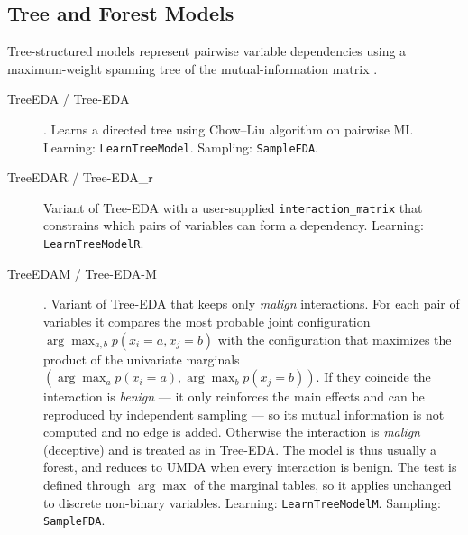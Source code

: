 \documentclass[a4paper,11pt]{article}
\begin{document}
\subsection{Tree and Forest Models}
\label{sec:trees}

Tree-structured models represent pairwise variable dependencies using a maximum-weight spanning tree of the mutual-information matrix \citep{Chow_and_Liu:1968}.

\begin{description}
  \item[TreeEDA / Tree-EDA] \citep{Baluja_and_Davies:1997}.
    Learns a directed tree using Chow--Liu algorithm on pairwise MI.
    Learning: \texttt{LearnTreeModel}. Sampling: \texttt{SampleFDA}.

  \item[TreeEDAR / Tree-EDA\_r] \citep{Baluja:2006,Santana_et_al:2007b}
    Variant of Tree-EDA with a user-supplied \texttt{interaction\_matrix} that constrains which pairs of variables can form a dependency.
    Learning: \texttt{LearnTreeModelR}.

  \item[TreeEDAM / Tree-EDA-M] \citep{Santana_et_al:2005int}.
    Variant of Tree-EDA that keeps only \emph{malign} interactions.  For each pair of variables it compares the most probable joint configuration $\arg\max_{a,b} p(x_i=a,x_j=b)$ with the configuration that maximizes the product of the univariate marginals $(\arg\max_a p(x_i=a),\arg\max_b p(x_j=b))$.  If they coincide the interaction is \emph{benign} --- it only reinforces the main effects and can be reproduced by independent sampling --- so its mutual information is not computed and no edge is added.  Otherwise the interaction is \emph{malign} (deceptive) and is treated as in Tree-EDA.  The model is thus usually a forest, and reduces to UMDA when every interaction is benign.  The test is defined through $\arg\max$ of the marginal tables, so it applies unchanged to discrete non-binary variables.
    Learning: \texttt{LearnTreeModelM}. Sampling: \texttt{SampleFDA}.


\end{description}
\end{document}
